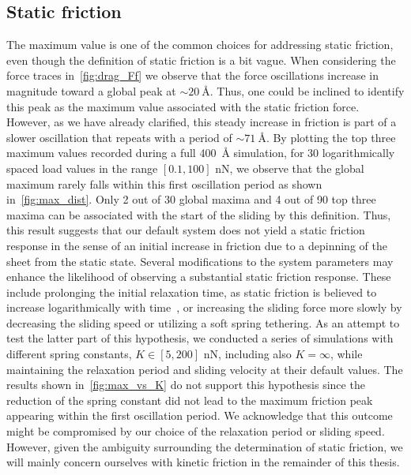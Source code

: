 \subsection{Static friction} 
The maximum value is one of the common choices for addressing static friction,
even though the definition of static friction is a bit vague. When considering
the force traces in~\cref{fig:drag_Ff} we observe that the force oscillations
increase in magnitude toward a global peak at $\sim \SI{20}{\text{Å}}$. Thus,
one could be inclined to identify this peak as the maximum value associated with
the static friction force. However, as we have already clarified, this steady
increase in friction is part of a slower oscillation that repeats with a period
of $\sim \SI{71}{\text{Å}}$. By plotting the top three maximum values recorded
during a full \SI{400}{Å} simulation, for 30 logarithmically spaced load values
in the range $[0.1, 100]$ nN, we observe that the global maximum rarely falls within
this first oscillation period as shown in~\cref{fig:max_dist}. Only 2 out of 30
global maxima and 4 out of 90 top three maxima can be associated with the start
of the sliding by this definition. Thus, this result suggests that our default
system does not yield a static friction response in the sense of an initial
increase in friction due to a depinning of the sheet from the static state.
Several modifications to the system parameters may enhance the likelihood of
observing a substantial static friction response. These include prolonging the
initial relaxation time, as static friction is believed to increase
logarithmically with time~\cite{dieterich_1972}, or increasing the sliding force
more slowly by decreasing the sliding speed or utilizing a soft spring tethering. As an attempt to test the
latter part of this hypothesis, we conducted a series of simulations with
different spring constants, $K\in [5, 200]$ nN, including also $K = \infty$,
while maintaining the relaxation period and sliding velocity at their default
values. The results shown in~\ref{fig:max_vs_K} do not support this hypothesis
since the reduction of the spring constant did not lead to the maximum
friction peak appearing within the first oscillation period. We acknowledge that
this outcome might be compromised by our choice of the relaxation period or sliding speed. However, given the
ambiguity surrounding the determination of static friction, we will mainly
concern ourselves with kinetic friction in the remainder of this thesis.




